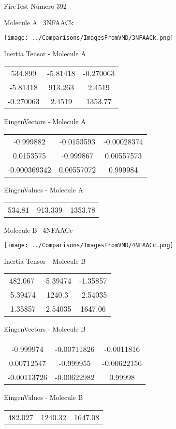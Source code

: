 \vtab[-3cm]
\begin{center}
{\large FireTest \tab Número 392}
\end{center}
\begin{multicols}{2}
\begin{center}

Molecule A \
3NFAACk

\texttt{[image: ../Comparisons/ImagesFromVMD/3NFAACk.png]}

Inertia Tensor - Molecule A \\
\begin{tabular}{|c c c|}
534.899	 & 	-5.81418	 & 	-0.270063	 \\
-5.81418	 & 	913.263	 & 	2.4519	 \\
-0.270063	 & 	2.4519	 & 	1353.77
\end{tabular}

\vtab
 EingenVectors - Molecule A     \\
\begin{tabular}{|c c c|}
-0.999882	 & 	-0.0153593	 & 	-0.00028374	 \\
0.0153575	 & 	-0.999867	 & 	0.00557573	 \\
-0.000369342	 & 	0.00557072	 & 	0.999984
\end{tabular}

\vtab
 EingenValues - Molecule A     \\
\begin{tabular}{|c c c|}
534.81	 & 	913.339	 & 	1353.78	 \\
\end{tabular}
\columnbreak

Molecule B \
4NFAACc

\texttt{[image: ../Comparisons/ImagesFromVMD/4NFAACc.png]}

Inertia Tensor - Molecule B \\
\begin{tabular}{|c c c|}
482.067	 & 	-5.39474	 & 	-1.35857	 \\
-5.39474	 & 	1240.3	 & 	-2.54035	 \\
-1.35857	 & 	-2.54035	 & 	1647.06
\end{tabular}

\vtab
 EingenVectors - Molecule B     \\
\begin{tabular}{|c c c|}
-0.999974	 & 	-0.00711826	 & 	-0.0011816	 \\
0.00712547	 & 	-0.999955	 & 	-0.00622156	 \\
-0.00113726	 & 	-0.00622982	 & 	0.99998
\end{tabular}

\vtab
 EingenValues - Molecule B     \\
\begin{tabular}{|c c c|}
482.027	 & 	1240.32	 & 	1647.08	 \\
\end{tabular}

\end{center}
\end{multicols}

